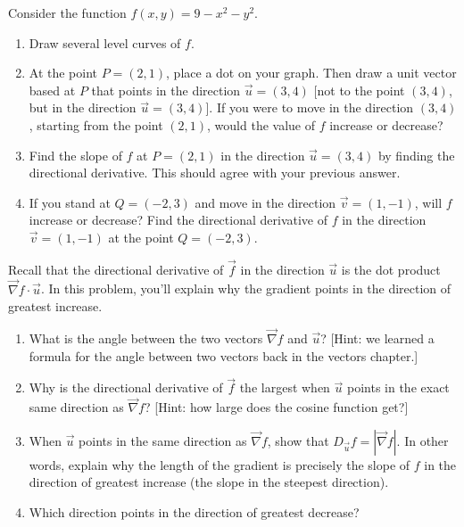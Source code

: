 \begin{problem}
 Consider the function $f(x,y) = 9-x^2-y^2$.
 \begin{enumerate}
  \item Draw several level curves of $f$. 
  \item At the point $P=(2,1)$, place a dot on your graph. Then draw a unit vector based at $P$ that points in the direction $\vec u=(3,4)$ [not to the point $(3,4)$, but in the direction $\vec u=(3,4)$]. If you were to move in the direction $(3,4)$, starting from the point $(2,1)$, would the value of $f$ increase or decrease?
  \item Find the slope of $f$ at $P=(2,1)$ in the direction $\vec u=(3,4)$ by finding the directional derivative. This should agree with your previous answer.
  \item If you stand at $Q=(-2,3)$ and move in the direction $\vec v= (1,-1)$, will $f$ increase or decrease?  Find the directional derivative of $f$ in the direction $\vec v=(1,-1)$ at the point $Q=(-2,3)$.
 \end{enumerate}
\end{problem}

\begin{problem}
Recall that the directional derivative of $\vec f$ in the direction $\vec u$ is the dot product $\vec \nabla f\cdot \vec u$. In this problem, you'll explain why the gradient points in the direction of greatest increase.
\begin{enumerate}
 \item What is the angle between the two vectors $\vec \nabla f$ and $\vec u$? [Hint: we learned a formula for the angle between two vectors back in the vectors chapter.]
 \item Why is the directional derivative of $\vec f$ the largest when $\vec u$ points in the exact same direction as $\vec \nabla f$? [Hint: how large does the cosine function get?]
 \item When $\vec u$ points in the same direction as $\vec \nabla f$, show that $D_{\vec u}f = |\vec \nabla f|$. In other words, explain why the length of the gradient is precisely the slope of $f$ in the direction of greatest increase (the slope in the steepest direction).
 \item Which direction points in the direction of greatest decrease?
\end{enumerate}
\end{problem}

